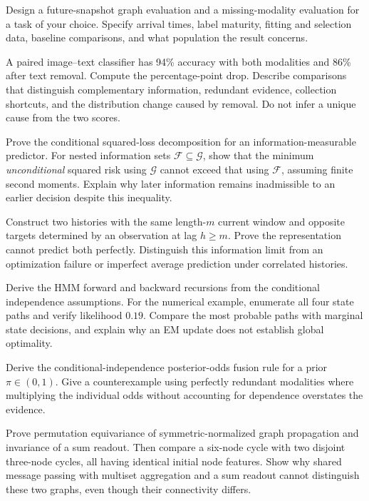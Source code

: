 \begin{exercises}
\item {}Design a future-snapshot graph evaluation and a missing-modality evaluation for a task of your choice. Specify arrival times, label maturity, fitting and selection data, baseline comparisons, and what population the result concerns.
\item {}A paired image--text classifier has 94\% accuracy with both modalities and 86\% after text removal. Compute the percentage-point drop. Describe comparisons that distinguish complementary information, redundant evidence, collection shortcuts, and the distribution change caused by removal. Do not infer a unique cause from the two scores.
\end{exercises}

\begin{challengeexercises}
\item {}Prove the conditional squared-loss decomposition for an information-measurable predictor. For nested information sets $\mathcal F\subseteq\mathcal G$, show that the minimum \emph{unconditional} squared risk using $\mathcal G$ cannot exceed that using $\mathcal F$, assuming finite second moments. Explain why later information remains inadmissible to an earlier decision despite this inequality.
\item {}Construct two histories with the same length-$m$ current window and opposite targets determined by an observation at lag $h\ge m$. Prove the representation cannot predict both perfectly. Distinguish this information limit from an optimization failure or imperfect average prediction under correlated histories.
\item {}Derive the HMM forward and backward recursions from the conditional independence assumptions. For the numerical example, enumerate all four state paths and verify likelihood $0.19$. Compare the most probable paths with marginal state decisions, and explain why an EM update does not establish global optimality.
\item {}Derive the conditional-independence posterior-odds fusion rule for a prior $\pi\in(0,1)$. Give a counterexample using perfectly redundant modalities where multiplying the individual odds without accounting for dependence overstates the evidence.
\newpage
\item {}Prove permutation equivariance of symmetric-normalized graph propagation and invariance of a sum readout. Then compare a six-node cycle with two disjoint three-node cycles, all having identical initial node features. Show why shared message passing with multiset aggregation and a sum readout cannot distinguish these two graphs, even though their connectivity differs.

\end{challengeexercises}
